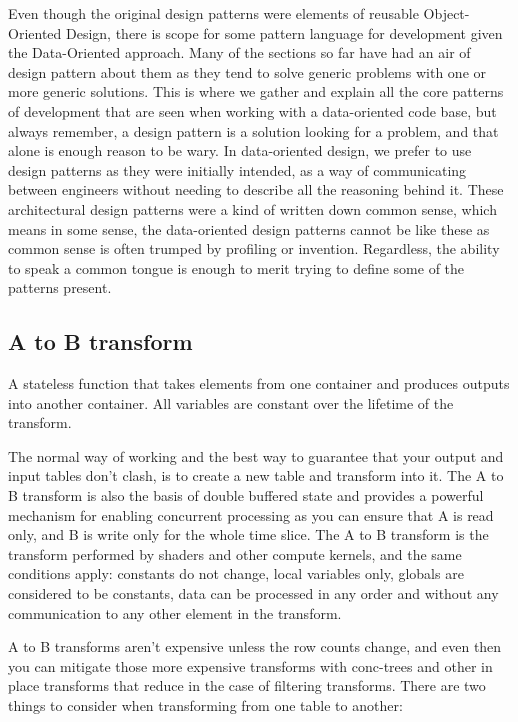 Even though the original design patterns were elements of reusable
Object-Oriented Design, there is scope for some pattern language for
development given the Data-Oriented approach. Many of the sections so far have
had an air of design pattern about them as they tend to solve generic problems
with one or more generic solutions. This is where we gather and explain all the
core patterns of development that are seen when working with a data-oriented
code base, but always remember, a design pattern is a solution looking for a
problem, and that alone is enough reason to be wary. In data-oriented design,
we prefer to use design patterns as they were initially intended, as a way of
communicating between engineers without needing to describe all the reasoning
behind it. These architectural design patterns were a kind of written down
common sense, which means in some sense, the data-oriented design patterns
cannot be like these as common sense is often trumped by profiling or
invention. Regardless, the ability to speak a common tongue is enough to merit
trying to define some of the patterns present.

\subsection{A to B transform}

A stateless function that takes elements from one container and produces
outputs into another container. All variables are constant over the lifetime of
the transform.

The normal way of working and the best way to guarantee that your output and
input tables don't clash, is to create a new table and transform into it. The A
to B transform is also the basis of double buffered state and provides a
powerful mechanism for enabling concurrent processing as you can ensure that A
is read only, and B is write only for the whole time slice. The A to B
transform is the transform performed by shaders and other compute kernels, and
the same conditions apply: constants do not change, local variables only,
globals are considered to be constants, data can be processed in any order and
without any communication to any other element in the transform.

A to B transforms aren't expensive unless the row counts change, and even then
you can mitigate those more expensive transforms with conc-trees and other in
place transforms that reduce in the case of filtering transforms. There are two
things to consider when transforming from one table to another:


